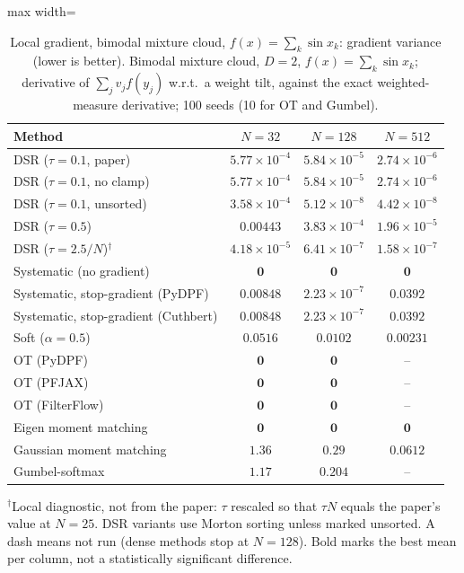 \begin{table}[H]
\centering
\small
\caption{Local gradient, bimodal mixture cloud, $f(x)=\sum_k\sin x_k$: gradient variance (lower is better). Bimodal mixture cloud, $D{=}2$, $f(x)=\sum_k\sin x_k$; derivative of $\sum_j v_j f(y_j)$ w.r.t.\ a weight tilt, against the exact weighted-measure derivative; 100 seeds (10 for OT and Gumbel).}
\label{tab:grad-mixture-sin-gradient_variance}
\begin{adjustbox}{max width=\linewidth}
\begin{tabular}{lccc}
\toprule
Method & $N{=}32$ & $N{=}128$ & $N{=}512$ \\
\midrule
DSR ($\tau{=}0.1$, paper) & $5.77\times10^{-4}$ & $5.84\times10^{-5}$ & $2.74\times10^{-6}$ \\
DSR ($\tau{=}0.1$, no clamp) & $5.77\times10^{-4}$ & $5.84\times10^{-5}$ & $2.74\times10^{-6}$ \\
DSR ($\tau{=}0.1$, unsorted) & $3.58\times10^{-4}$ & $5.12\times10^{-8}$ & $4.42\times10^{-8}$ \\
DSR ($\tau{=}0.5$) & $0.00443$ & $3.83\times10^{-4}$ & $1.96\times10^{-5}$ \\
DSR ($\tau{=}2.5/N$)$^\dagger$ & $4.18\times10^{-5}$ & $6.41\times10^{-7}$ & $1.58\times10^{-7}$ \\
\midrule
Systematic (no gradient) & $\mathbf{0}$ & $\mathbf{0}$ & $\mathbf{0}$ \\
Systematic, stop-gradient (PyDPF) & $0.00848$ & $2.23\times10^{-7}$ & $0.0392$ \\
Systematic, stop-gradient (Cuthbert) & $0.00848$ & $2.23\times10^{-7}$ & $0.0392$ \\
Soft ($\alpha{=}0.5$) & $0.0516$ & $0.0102$ & $0.00231$ \\
OT (PyDPF) & $\mathbf{0}$ & $\mathbf{0}$ & -- \\
OT (PFJAX) & $\mathbf{0}$ & $\mathbf{0}$ & -- \\
OT (FilterFlow) & $\mathbf{0}$ & $\mathbf{0}$ & -- \\
Eigen moment matching & $\mathbf{0}$ & $\mathbf{0}$ & $\mathbf{0}$ \\
Gaussian moment matching & $1.36$ & $0.29$ & $0.0612$ \\
Gumbel-softmax & $1.17$ & $0.204$ & -- \\
\bottomrule
\end{tabular}
\end{adjustbox}
\par\smallskip\parbox{0.95\linewidth}{\footnotesize $^\dagger$Local diagnostic, not from the paper: $\tau$ rescaled so that $\tau N$ equals the paper's value at $N{=}25$. DSR variants use Morton sorting unless marked unsorted. A dash means not run (dense methods stop at $N{=}128$). Bold marks the best mean per column, not a statistically significant difference.}
\end{table}

